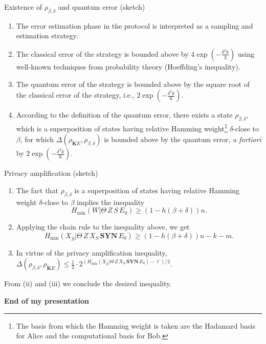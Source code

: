 \documentclass{beamer}
\begin{document}
\begin{frame}{Existence of $\rho_{\beta,\delta}$ and quantum error (sketch)}
\begin{enumerate}[label=(\roman*)]
\item The error estimation phase in the protocol is interpreted as a sampling and estimation strategy. 
\item The classical error of the strategy is bounded above by $4\exp\left( -\frac{\delta^2 k}{3} \right)$ using well-known techniques from probability theory (Hoeffding's inequality).
\item The quantum error of the strategy is bounded above by the square root of the classical error of the strategy, i.e., $2\exp\left( -\frac{\delta^2 k}{6} \right)$.
\item According to the definition of the quantum error, there exists a state $\rho_{\beta,\delta}$, which is a superposition of states having relative Hamming weight\footnote{The basis from which the Hamming weight is taken are the Hadamard basis for Alice and the computational
basis for Bob.} $\delta$-close to $\beta$, for which $\Delta\left( \rho_{\mathbf{K}E}, \rho_{\beta,\delta} \right)$ is bounded above by the quantum error, \emph{a fortiori} by $2\exp\left( -\frac{\delta^2 k}{6} \right)$.
\end{enumerate}
\end{frame}

\begin{frame}{Privacy amplification (sketch)}
\begin{enumerate}[label=(\roman*)]
\item The fact that $\rho_{\beta,\delta}$ is a superposition of states having relative Hamming weight $\delta$-close to $\beta$ implies the inequality
$$
H_{\min}(W|\Theta \, Z \, S \, E_0) \geq \left(1 - h(\beta + \delta) \right) n.
$$
\item Applying the chain rule to the inequality above, we get
$$
H_{\min}(X_{\overline{S}}|\Theta \, Z \, X_S \, \textbf{SYN} \, E_0) \geq \left(1 - h(\beta + \delta) \right) n - k - m.
$$

\item In virtue of the privacy amplification inequality, $\Delta\left(\rho_{\beta,\delta}, \rho_{\mathbf{\tilde{K}}E} \right) \leq \frac{1}{2}\cdot 2^{\left(H_{\min}(X_{\overline{S}}|\Theta \, Z \, X_S \, \textbf{SYN} \, E_0) - \ell \right)/2}$.
\end{enumerate}

From (ii) and (iii) we conclude the desired inequality.
\end{frame}

\begin{frame}
\begin{center}
\Large{\textbf{End of my presentation} }
\end{center}
\end{frame}
\end{document}
